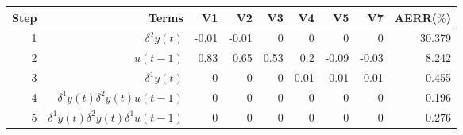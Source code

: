 \begin{tabular}{rrrrrrrrr}
Step & Terms & V1 & V2 & V3 & V4 & V5 & V7 & AERR($\%$) \\ 
\hline 
1 & $\delta^2 y(t)$ & -0.01 & -0.01 & 0 & 0 & 0 & 0 & 30.379 \\ 
2 & $u(t-1)$ & 0.83 & 0.65 & 0.53 & 0.2 & -0.09 & -0.03 & 8.242 \\ 
3 & $\delta^1 y(t)$ & 0 & 0 & 0 & 0.01 & 0.01 & 0.01 & 0.455 \\ 
4 & $\delta^1 y(t)\delta^2 y(t)u(t-1)$ & 0 & 0 & 0 & 0 & 0 & 0 & 0.196 \\ 
5 & $\delta^1 y(t)\delta^2 y(t)\delta^1 u(t-1)$ & 0 & 0 & 0 & 0 & 0 & 0 & 0.276 \\ 
\hline 
\end{tabular}
